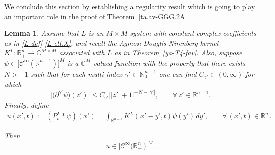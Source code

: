 \documentclass[11pt,reqno]{amsart}
\numberwithin{equation}{section}
\newtheorem{lemma}[theorem]{Lemma}
\theoremstyle{remark}
\begin{document}
We conclude this section by establishing a regularity result which is going to play an important 
role in the proof of Theorem~\ref{ta.av-GGG.2A}.

\begin{lemma}\label{UYfa-uVdssk}
Assume that $L$ is an $M\times M$ system with constant complex coefficients as in \eqref{L-def}-\eqref{L-ell.X},
and recall the Agmon-Douglis-Nirenberg kernel $K^L:{\mathbb{R}}^n_{+}\to{\mathbb{C}}^{M\times M}$ associated with $L$
as in Theorem~\ref{ya-T4-fav}. Also, suppose $\psi\in\big[{\mathscr{C}}^\infty({\mathbb{R}}^{n-1})\big]^M$ is a ${\mathbb{C}}^{M}$-valued 
function with the property that there exists $N>-1$ such that for each multi-index
$\gamma'\in{\mathbb{N}}_0^{n-1}$ one can find $C_{\gamma'}\in(0,\infty)$ for which 
%
\begin{equation}\label{TFFV-b54EE.1}
\big|\big(\partial^{\gamma'}\psi\big)(z')\big|\leq C_{\gamma'}\big[|z'|+1]^{-N-|\gamma'|},
\qquad\forall\,z'\in{\mathbb{R}}^{n-1}.
\end{equation}
%
Finally, define 
%
\begin{align}\label{eq1.6Adaf.Rd}
u(x',t):=(P^L_t\ast\psi)(x')=\int_{{\mathbb{R}}^{n-1}}K^L(x'-y',t)\psi(y')\,dy',\qquad
\forall\,(x',t)\in{\mathbb{R}}^n_{+}.
\end{align}

Then 
%
\begin{equation}\label{Lnabv-ufwhJ}
u\in\big[{\mathscr{C}}^\infty\big(\overline{{\mathbb{R}}^n_{+}}\,\big)\big]^{M}.
\end{equation}
\end{lemma}
\end{document}

